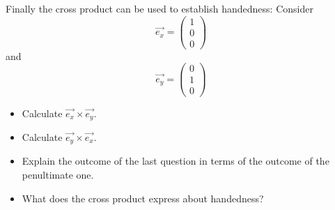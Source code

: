 \documentclass[a4wide]{article}
\begin{document}
Finally the cross product can be used to establish handedness:
Consider 
$$
\vec{e_x} = \left( \begin{array}{c} 1 \\ 0 \\ 0 \end{array} \right)
$$
and
$$
\vec{e_y} = \left( \begin{array}{c} 0 \\ 1 \\ 0 \end{array} \right)
$$
\begin{itemize}
  \item Calculate $\vec{e_x} \times \vec{e_y}$.
  \item Calculate $\vec{e_y} \times \vec{e_x}$.
  \item Explain the outcome of the last question in terms of the outcome of the penultimate one.
  \item What does the cross product express about handedness?
\end{itemize}
\end{document}
